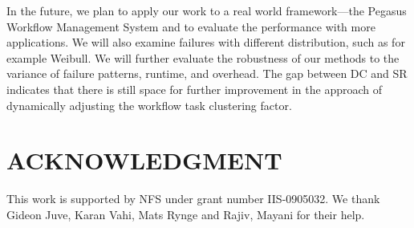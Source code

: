 \documentclass{IOS-Book-Article}
\begin{document}
In the future, we plan to apply our work to a real world framework---the Pegasus Workflow Management System and to evaluate the performance with more applications. We will also examine failures with different distribution, such as for example Weibull.  We will further evaluate the robustness of our methods to the variance of failure patterns, runtime, and overhead. The gap between DC and SR indicates that there is still space for further improvement in the approach of dynamically adjusting the workflow task clustering factor. 

\section{ACKNOWLEDGMENT}
This work is supported by NFS under grant number IIS-0905032. We thank Gideon Juve, Karan Vahi, Mats Rynge and Rajiv, Mayani for their help. 




\end{document}
